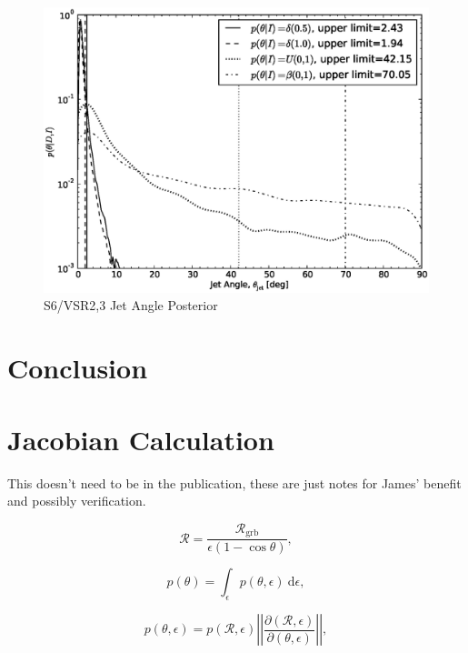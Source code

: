 \documentclass[twocolumn,nofootinbib]{revtex4-1}
\newcommand{\grbrate}{{{\mathcal R}_{\mathrm{grb}}}}
\newcommand{\cbcrate}{{{\mathcal R}}}
\newcommand{\diff}{{\mathrm d}}
\begin{document}
\begin{figure}
\centering
\includegraphics[width=\linewidth]{jet_angle_posterior_iligo.eps}
\caption{S6/VSR2,3 Jet Angle Posterior\label{fig:s6angle}}
\end{figure}

\section{Conclusion}

\appendix


\section{Jacobian Calculation}
This doesn't need to be in the publication, these are just notes for James'
benefit and possibly verification.

\begin{equation}
\cbcrate=\frac{\grbrate}{\epsilon(1-\cos \theta)},
\end{equation}

\begin{equation}
p(\theta) = \int_{\epsilon} p(\theta,\epsilon)~\diff \epsilon,
\end{equation}

\begin{equation}
p(\theta,\epsilon) = p(\cbcrate,\epsilon)
\left\lvert\left\lvert
\frac{\partial(\cbcrate,\epsilon)}{\partial(\theta,\epsilon)}
\right\rvert\right\rvert,
\end{equation}

\begingroup
\renewcommand*{\arraystretch}{1.5}
\end{document}
